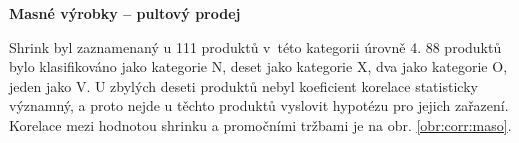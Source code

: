 
\textbf{Masné výrobky -- pultový prodej}

Shrink byl zaznamenaný u 111 produktů v~této kategorii úrovně 4. 88 produktů bylo klasifikováno jako kategorie N, deset jako kategorie X, dva jako kategorie O, jeden jako V. U zbylých deseti produktů nebyl koeficient korelace statisticky významný, a proto nejde u těchto produktů vyslovit hypotézu pro jejich zařazení. Korelace mezi hodnotou shrinku a promočními tržbami je na obr. \ref*{obr:corr:maso}.

